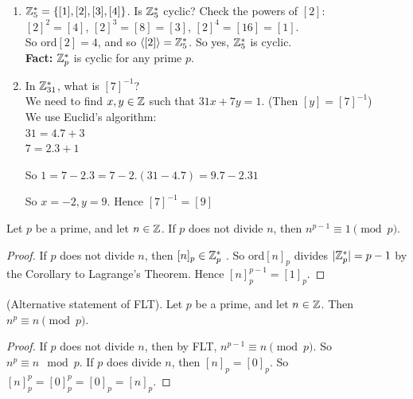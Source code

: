 \documentclass[twoside]{scrartcl}
\begin{document}
 
\begin{examples} \begin{enumerate}
 \item 	 {} 
 $\mathbb{Z}_5^* = \{[1],[2],[3],[4]\}$. Is $\mathbb{Z}_5^*$ cyclic? Check the powers of $[2]$:\\ $[2]^2 = [4]$, $[2]^3 = [8] = [3]$, $[2]^4 = [16] = [1]$.\\
  
  So ord$[2] = 4$, and so $\langle[2]\rangle = \mathbb{Z}_5^*$. So yes, $\mathbb{Z}_5^*$ is cyclic.\\
 
 \textbf{Fact:} $\mathbb{Z}_p^*$ is cyclic for any prime $p$.
 \item In $\mathbb{Z}_{31}^*$, what is $[7]^{-1}$?\\
 We need to find $x,y \in \mathbb{Z}$ such that $31x + 7y = 1$. (Then $[y] = [7]^{-1}$)\\ We use Euclid's algorithm:\\
 $31 = 4.7 + 3$\\
$ 7 = 2.3 + 1$
 
 So $1 = 7 - 2.3  = 7-2.(31-4.7) = 9.7 - 2.31$
 
 So $x = -2,y=9$. Hence $[7]^{-1} = [9]$
 \end{enumerate}
 \end{examples}\vspace*{10pt}

\begin{theorem}  Let $p$ be a prime, and let $n \in \mathbb{Z}$. If $p$ does not divide $n$, then $n^{p-1} \equiv 1 \pmod{p}$.	
\end{theorem}

\begin{proof}
If $p$ does not divide $n$, then $[n]_p \in \mathbb{Z}_p^*$	. So ord$[n]_p$ divides $|\mathbb{Z}_p^*| = p-1$ by the Corollary to Lagrange's Theorem. Hence $[n]_p^{p-1} = [1]_p$. 
\end{proof}\vspace*{10pt}

\begin{corollary} (Alternative statement of FLT). Let $p$ be a prime, and let $n \in \mathbb{Z}$. Then $n^p \equiv n \pmod{p}$.
	
\end{corollary}

\begin{proof}
If $p$ does not divide $n$, then by FLT, $n^{p-1} \equiv n \pmod{p}.$  So $n^p \equiv n \mod p.$ If $p$ does divide $n$, then $[n]_p = [0]_p$. So $[n]_p^p = [0]_p^p = [0]_p = [n]_p$.	
\end{proof}\vspace*{10pt}
\end{document}

